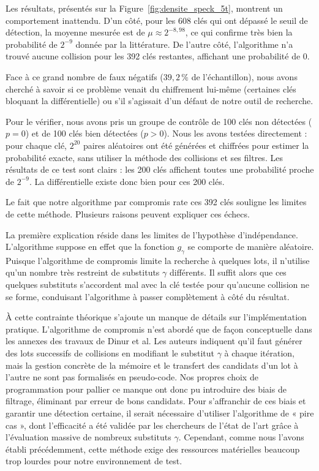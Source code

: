 \documentclass[a4paper,11pt]{article}
\begin{document}
Les résultats, présentés sur la Figure~\ref{fig:densite_speck_5t}, montrent un comportement inattendu. D'un côté, pour les 608 clés qui ont dépassé le seuil de détection, la moyenne mesurée est de $\mu \approx 2^{-8,98}$, ce qui confirme très bien la probabilité de $2^{-9}$ donnée par la littérature. De l'autre côté, l'algorithme n'a trouvé aucune collision pour les 392 clés restantes, affichant une probabilité de $0$. 

Face à ce grand nombre de faux négatifs ($39,2\,\%$ de l'échantillon), nous avons cherché à savoir si ce problème venait du chiffrement lui-même (certaines clés bloquant la différentielle) ou s'il s'agissait d'un défaut de notre outil de recherche. 

Pour le vérifier, nous avons pris un groupe de contrôle de 100 clés non détectées ($p=0$) et de 100 clés bien détectées ($p>0$). Nous les avons testées directement : pour chaque clé, $2^{20}$ paires aléatoires ont été générées et chiffrées pour estimer la probabilité exacte, sans utiliser la méthode des collisions et ses filtres. Les résultats de ce test sont clairs : les 200 clés affichent toutes une probabilité proche de $2^{-9}$. La différentielle existe donc bien pour ces 200 clés.

Le fait que notre algorithme par compromis rate ces 392 clés souligne les limites de cette méthode. Plusieurs raisons peuvent expliquer ces échecs.

La première explication réside dans les limites de l'hypothèse d'indépendance. L'algorithme suppose en effet que la fonction $g_{\gamma}$ se comporte de manière aléatoire. Puisque l'algorithme de compromis limite la recherche à quelques lots, il n'utilise qu'un nombre très restreint de substituts $\gamma$ différents. Il suffit alors que ces quelques substituts s'accordent mal avec la clé testée pour qu'aucune collision ne se forme, conduisant l'algorithme à passer complètement à côté du résultat.

À cette contrainte théorique s'ajoute un manque de détails sur l'implémentation pratique. L'algorithme de compromis n'est abordé que de façon conceptuelle dans les annexes des travaux de Dinur et al. Les auteurs indiquent qu'il faut générer des lots successifs de collisions en modifiant le substitut $\gamma$ à chaque itération, mais la gestion concrète de la mémoire et le transfert des candidats d'un lot à l'autre ne sont pas formalisés en pseudo-code. Nos propres choix de programmation pour pallier ce manque ont donc pu introduire des biais de filtrage, éliminant par erreur de bons candidats. Pour s'affranchir de ces biais et garantir une détection certaine, il serait nécessaire d'utiliser l'algorithme de « pire cas », dont l'efficacité a été validée par les chercheurs de l'état de l'art grâce à l'évaluation massive de nombreux substituts $\gamma$. Cependant, comme nous l'avons établi précédemment, cette méthode exige des ressources matérielles beaucoup trop lourdes pour notre environnement de test.
\end{document}
